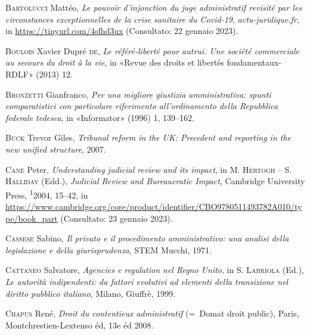 \documentclass[12pt,it,a4paper,]{report}
\newlength{\cslhangindent}
\newenvironment{CSLReferences}[2] %
 {%
  \setlength{\parindent}{0pt}
  \ifodd #1 \everypar{\setlength{\hangindent}{\cslhangindent}}\ignorespaces\fi
  \ifnum #2 > 0
  \setlength{\parskip}{#2\baselineskip}
  \fi
 }%
 {}
\begin{document}
\hypertarget{refs}{}
\begin{CSLReferences}{1}{0}
\leavevmode{}%
\textsc{Bartolucci} Mattéo, \emph{Le pouvoir d'injonction du juge
administratif revisité par les circonstances exceptionnelles de la crise
sanitaire du Covid-19}, \emph{actu-juridique.fr}, in
\url{https://tinyurl.com/4sfhd3ux} (Consultato: 22 gennaio 2023).

\leavevmode{}%
\textsc{Boulois} Xavier Dupré \textsc{de}, \emph{Le référé-liberté pour
autrui. Une société commerciale au secours du droit à la vie}, in
{«Revue des droits et libertés fondamentaux-RDLF»} (2013) 12.

\leavevmode{}%
\textsc{Bronzetti} Gianfranco, \emph{Per una migliore giustizia
amministrativa: spunti comparatistici con particolare riferimento
all'ordinamento della Repubblica federale tedesca}, in {«Informator»}
(1996) 1, 139--162.

\leavevmode{}%
\textsc{Buck} Trevor Giles, \emph{Tribunal reform in the UK: Precedent
and reporting in the new unified structure}, 2007.

\leavevmode{}%
\textsc{Cane} Peter, \emph{Understanding judicial review and its
impact}, in M. \textsc{Hertogh} -- S. \textsc{Halliday} (Edd.),
\emph{Judicial Review and Bureaucratic Impact}, Cambridge University
Press, \textsuperscript{1}2004, 15--42, in
\url{https://www.cambridge.org/core/product/identifier/CBO9780511493782A010/type/book_part}
(Consultato: 23 gennaio 2023).

\leavevmode{}%
\textsc{Cassese} Sabino, \emph{Il privato e il procedimento
amministrativo: una analisi della legislazione e della giurisprudenza},
STEM Mucchi, 1971.

\leavevmode{}%
\textsc{Cattaneo} Salvatore, \emph{Agencies e regulation nel Regno
Unito}, in S. \textsc{Labriola} (Ed.), \emph{Le autorità indipendenti:
da fattori evolutivi ad elementi della transizione nel diritto pubblico
italiano}, Milano, Giuffrè, 1999.

\leavevmode{}%
\textsc{Chapus} René, \emph{Droit du contentieux administratif} (=~Domat
droit public), Paris, Montchrestien-Lextenso éd, 13e éd 2008.


\end{CSLReferences}
\end{document}
